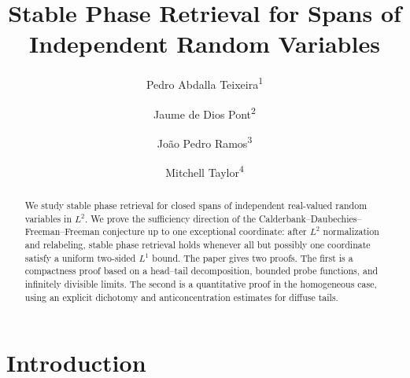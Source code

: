 \documentclass[11pt]{amsart}
\title[Stable Phase Retrieval for Independent Coordinates]{Stable Phase Retrieval for Spans of Independent Random Variables}
\author{Pedro Abdalla Teixeira\textsuperscript{1}}
\author{Jaume de Dios Pont\textsuperscript{2}}
\author{Jo\~ao Pedro Ramos\textsuperscript{3}}
\author{Mitchell Taylor\textsuperscript{4}}
\numberwithin{equation}{section}
\theoremstyle{definition}
\theoremstyle{remark}
\begin{document}

\begin{abstract}
We study stable phase retrieval for closed spans of independent real-valued
random variables in $L^2$.  We prove the sufficiency direction of the
Calderbank--Daubechies--Freeman--Freeman conjecture up to one exceptional
coordinate: after $L^2$ normalization and relabeling, stable phase retrieval
holds whenever all but possibly one coordinate satisfy a uniform two-sided
$L^1$ bound.  The paper gives two proofs.  The first is a compactness proof
based on a head--tail decomposition, bounded probe functions, and infinitely
divisible limits.  The second is a quantitative proof in the homogeneous case,
using an explicit dichotomy and anticoncentration estimates for diffuse tails.
\end{abstract}

\maketitle
\begingroup
\renewcommand{\thefootnote}{\arabic{footnote}}
\endgroup
\setcounter{footnote}{0}

\section{Introduction}
\end{document}
